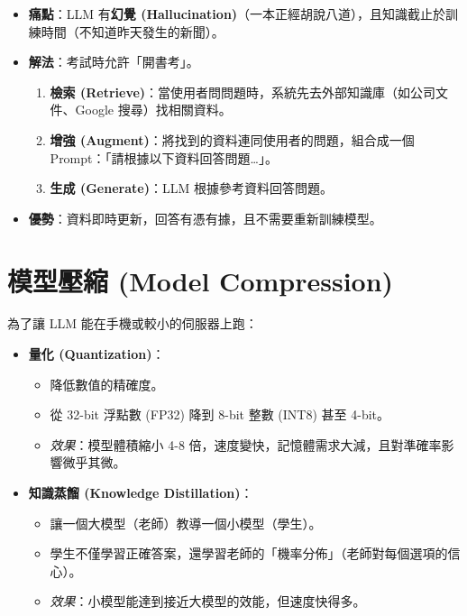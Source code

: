 \documentclass[
  letterpaper,
  DIV=11,
  numbers=noendperiod]{scrreprt}
\providecommand{\tightlist}{%
  \setlength{\itemsep}{0pt}\setlength{\parskip}{0pt}}
\begin{document}
\begin{itemize}
\tightlist
\item
  \textbf{痛點}：LLM 有\textbf{幻覺
  (Hallucination)}（一本正經胡說八道），且知識截止於訓練時間（不知道昨天發生的新聞）。
\item
  \textbf{解法}：考試時允許「開書考」。

  \begin{enumerate}
  \def\labelenumi{\arabic{enumi}.}
  \tightlist
  \item
    \textbf{檢索
    (Retrieve)}：當使用者問問題時，系統先去外部知識庫（如公司文件、Google
    搜尋）找相關資料。
  \item
    \textbf{增強 (Augment)}：將找到的資料連同使用者的問題，組合成一個
    Prompt：「請根據以下資料回答問題\ldots」。
  \item
    \textbf{生成 (Generate)}：LLM 根據參考資料回答問題。
  \end{enumerate}
\item
  \textbf{優勢}：資料即時更新，回答有憑有據，且不需要重新訓練模型。
\end{itemize}

\section{模型壓縮 (Model Compression)}\label{sec-model-compression}

為了讓 LLM 能在手機或較小的伺服器上跑：

\begin{itemize}
\tightlist
\item
  \textbf{量化 (Quantization)}：

  \begin{itemize}
  \tightlist
  \item
    降低數值的精確度。
  \item
    從 32-bit 浮點數 (FP32) 降到 8-bit 整數 (INT8) 甚至 4-bit。
  \item
    \emph{效果}：模型體積縮小 4-8
    倍，速度變快，記憶體需求大減，且對準確率影響微乎其微。
  \end{itemize}
\item
  \textbf{知識蒸餾 (Knowledge Distillation)}：

  \begin{itemize}
  \tightlist
  \item
    讓一個大模型（老師）教導一個小模型（學生）。
  \item
    學生不僅學習正確答案，還學習老師的「機率分佈」（老師對每個選項的信心）。
  \item
    \emph{效果}：小模型能達到接近大模型的效能，但速度快得多。
  \end{itemize}
\end{itemize}
\end{document}
